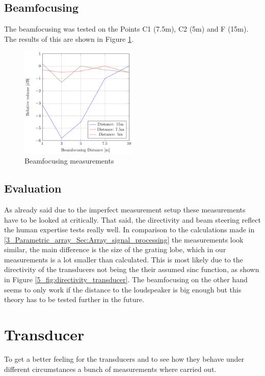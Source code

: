 \subsection{Beamfocusing}
The beamfocusing was tested on the Points C1 (7.5m), C2 (5m) and F (15m). The results of this are shown in Figure \ref{6_fig:beamforming_measurements}.
\begin{figure}
    \centering
    \includegraphics[width=0.5\textwidth]{images/6_Measurements/Beamfocusing.pdf}
    \caption{Beamfocusing measurements}
    \label{6_fig:beamforming_measurements}
\end{figure}
\subsection{Evaluation}
As already said due to the imperfect measurement setup these measurements have to be looked at critically. That said, the directivity and beam steering reflect the human expertise tests really well. In comparison to the calculations made in \ref{3_Parametric_array_Sec:Array_signal_processing} the measurements look similar, the main difference is the size of the grating lobe, which in our measurements is a lot smaller than calculated. This is most likely due to the directivity of the transducers not being the their assumed sinc function, as shown in Figure \ref{5_fig:directivity_transducer}. 
The beamfocusing on the other hand seems to only work if the distance to the loudspeaker is big enough but this theory has to be tested further in the future. 
\section{Transducer}
To get a better feeling for the transducers and to see how they behave under different circumstances a bunch of measurements where carried out. 
